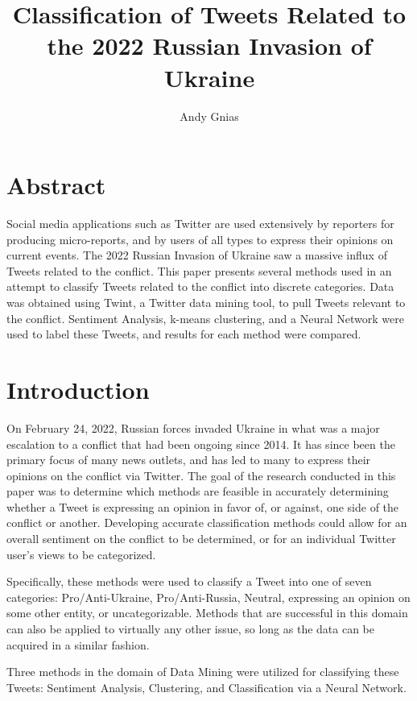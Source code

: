 \documentclass[12pt,letterpaper,oneside,titlepage]{article}
\title{Classification of Tweets Related to the 2022 Russian Invasion of Ukraine}
\author{Andy Gnias}
\begin{document}
\maketitle

\section{Abstract}\label{sec:abstract}

Social media applications such as Twitter are used extensively by reporters for producing micro-reports, and by users of
all types to express their opinions on current events. 
The 2022 Russian Invasion of Ukraine saw a massive influx of Tweets related to the conflict.
This paper presents several methods used in an attempt to classify Tweets related to the conflict into discrete
categories.
Data was obtained using Twint, a Twitter data mining tool, to pull Tweets relevant to the conflict.
Sentiment Analysis, k-means clustering, and a Neural Network were used to label these Tweets, and results
for each method were compared.

\section{Introduction}\label{sec:introduction}

On February 24, 2022, Russian forces invaded Ukraine in what was a major escalation to a conflict that had been ongoing since 2014\cite{ukr}.
It has since been the primary focus of many news outlets, and has led to many to express their opinions on the conflict via Twitter. 
The goal of the research conducted in this paper was to determine which methods are feasible in accurately determining whether a 
Tweet is expressing an opinion in favor of, or against, one side of the conflict or another. 
Developing accurate classification methods could allow for an overall sentiment on the conflict to be determined, or for 
an individual Twitter user's views to be categorized.

Specifically, these methods were used to classify a Tweet into one of seven categories: 
Pro/Anti-Ukraine, Pro/Anti-Russia, Neutral, expressing an opinion on some other entity, or uncategorizable. 
Methods that are successful in this domain can also be applied to virtually any other issue, so long as the data can be acquired in a similar fashion. 

Three methods in the domain of Data Mining were utilized for classifying these Tweets: Sentiment Analysis, Clustering, and Classification via a Neural Network.
\end{document}
